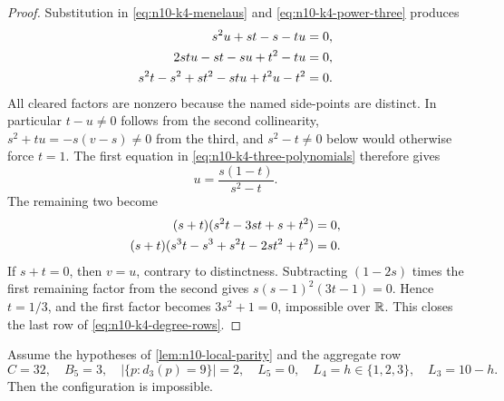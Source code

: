 \begin{proof}
Substitution in \eqref{eq:n10-k4-menelaus} and
\eqref{eq:n10-k4-power-three} produces
\begin{align}
 s^2u+st-s-tu&=0,\notag\\
 2stu-st-su+t^2-tu&=0,\label{eq:n10-k4-three-polynomials}\\
 s^2t-s^2+st^2-stu+t^2u-t^2&=0.\notag
\end{align}
All cleared factors are nonzero because the named side-points are distinct.
In particular $t-u\ne0$ follows from the second collinearity,
$s^2+tu=-s(v-s)\ne0$ from the third, and $s^2-t\ne0$ below would otherwise
force $t=1$.  The first equation in
\eqref{eq:n10-k4-three-polynomials} therefore gives
\[
 u=\frac{s(1-t)}{s^2-t}.
\]
The remaining two become
\begin{align}
 (s+t)(s^2t-3st+s+t^2)&=0,\notag\\
 (s+t)(s^3t-s^3+s^2t-2st^2+t^2)&=0.
 \label{eq:n10-k4-final-two}
\end{align}
If $s+t=0$, then $v=u$, contrary to distinctness.  Subtracting
$(1-2s)$ times the first remaining factor from the second gives
$s(s-1)^2(3t-1)=0$.  Hence $t=1/3$, and the first factor becomes
$3s^2+1=0$, impossible over $\mathbb{R}$.  This closes the last row of
\eqref{eq:n10-k4-degree-rows}.
\end{proof}

\begin{lemma}
\label{lem:n10-three-pentagon-endpoint}
Assume the hypotheses of \cref{lem:n10-local-parity} and the aggregate row
\[
 C=32,\quad B_5=3,\quad
 |\{p:d_3(p)=9\}|=2,\quad L_5=0,
 \quad L_4=h\in\{1,2,3\},\quad L_3=10-h.
\]
Then the configuration is impossible.
\end{lemma}

